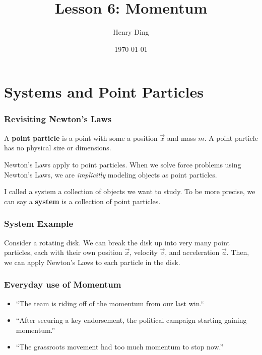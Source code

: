 \documentclass[20pt]{beamer}
\author{Henry Ding}
\date{\today}
\title{Lesson 6: Momentum}
\begin{document}
\frame{\titlepage}

\section{Systems and Point Particles}

\begin{frame}
	\frametitle{Revisiting Newton's Laws}
	\begin{definition}
		A \textbf{point particle} is a point with some a position $\vec{x}$ and mass $m$. A point particle has no physical size or dimensions.
	\end{definition}
	\begin{alertblock}{Newton's Laws apply to point particles.}
		When we solve force problems using Newton's Laws, we are \textit{implicitly} modeling objects as point particles.
	\end{alertblock}
	\begin{definition}
		I called a system a collection of objects we want to study. To be more precise, we can say a \textbf{system} is a collection of point particles.
	\end{definition}
	\begin{figure}[ht]
		\centering
		\label{fig:system}
	\end{figure}
\end{frame}

\begin{frame}
	\frametitle{System Example}
	Consider a rotating disk. We can break the disk up into very many point particles, each with their own position $\vec{x}$, velocity $\vec{v}$, and acceleration $\vec{a}$.
	Then, we can apply Newton's Laws to each particle in the disk.
	\begin{figure}[ht]
		\centering
		\label{fig:disk}
	\end{figure}
\end{frame}

\begin{frame}
	\frametitle{Everyday use of Momentum}
	\begin{itemize}
		\item ``The team is riding off of the momentum from our last win.``
		\item ``After securing a key endorsement, the political campaign starting gaining momentum.''
		\item ``The grassroots movement had too much momentum to stop now.''
	\end{itemize}
\end{frame}
\end{document}
